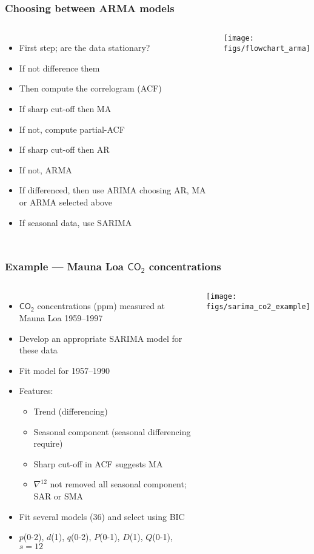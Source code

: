 \documentclass{beamer}
\begin{document}
\begin{frame}
    \frametitle{Choosing between ARMA models}
    \footnotesize
    \begin{columns}
    \column{4.75cm}
        \begin{itemize}
            \item First step; are the data stationary?
            \item If not difference them
            \item Then compute the correlogram (ACF)
            \item If sharp cut-off then MA
            \item If not, compute partial-ACF
            \item If sharp cut-off then AR
            \item If not, ARMA
            \item If differenced, then use ARIMA choosing AR, MA or ARMA selected above
            \item If seasonal data, use SARIMA
        \end{itemize}
    \column{7cm}
    \texttt{[image: figs/flowchart\_arma]}
    \end{columns}
    \normalsize
\end{frame}

\begin{frame}
    \frametitle{Example --- Mauna Loa $\mathsf{CO_2}$ concentrations}
    \small
    \begin{columns}
    \column{7cm}
        \begin{itemize}
            \item $\mathsf{CO_2}$ concentrations (ppm) measured at Mauna Loa 1959--1997
            \item Develop an appropriate SARIMA model for these data
            \item Fit model for 1957--1990
            \item Features:
            \begin{itemize}
                \item Trend (differencing)
                \item Seasonal component (seasonal differencing require)
                \item Sharp cut-off in ACF suggests MA
                \item $\nabla^{12}$ not removed all seasonal component; SAR or SMA
            \end{itemize}
            \item Fit several models (36) and select using BIC
            \item $p$(0-2), $d$(1), $q$(0-2), $P$(0-1), $D$(1), $Q$(0-1), $s={12}$
        \end{itemize}
    \column{5cm}
    \texttt{[image: figs/sarima\_co2\_example]}
    \end{columns}
    \normalsize
\end{frame}
\end{document}
